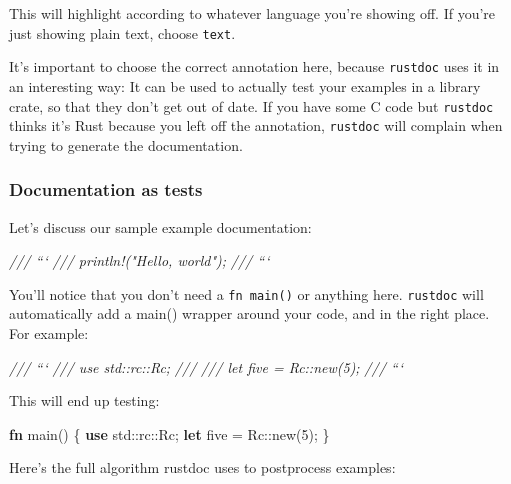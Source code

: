 \documentclass[a4paper,]{book}
\newenvironment{Shaded}{\begin{snugshade}}{\end{snugshade}}
\newcommand{\KeywordTok}[1]{\textcolor[rgb]{0.13,0.29,0.53}{\textbf{{#1}}}}
\newcommand{\DecValTok}[1]{\textcolor[rgb]{0.00,0.00,0.81}{{#1}}}
\newcommand{\CommentTok}[1]{\textcolor[rgb]{0.56,0.35,0.01}{\textit{{#1}}}}
\newcommand{\NormalTok}[1]{{#1}}
\begin{document}
This will highlight according to whatever language you're showing off.
If you're just showing plain text, choose \texttt{text}.

It's important to choose the correct annotation here, because
\texttt{rustdoc} uses it in an interesting way: It can be used to
actually test your examples in a library crate, so that they don't get
out of date. If you have some C code but \texttt{rustdoc} thinks it's
Rust because you left off the annotation, \texttt{rustdoc} will complain
when trying to generate the documentation.

\subsubsection{Documentation as tests}\label{documentation-as-tests}

Let's discuss our sample example documentation:

\begin{Shaded}
\begin{Highlighting}[]
\CommentTok{/// ```}
\CommentTok{/// println!("Hello, world");}
\CommentTok{/// ```}
\end{Highlighting}
\end{Shaded}

You'll notice that you don't need a \texttt{fn\ main()} or anything
here. \texttt{rustdoc} will automatically add a main() wrapper around
your code, and in the right place. For example:

\begin{Shaded}
\begin{Highlighting}[]
\CommentTok{/// ```}
\CommentTok{/// use std::rc::Rc;}
\CommentTok{///}
\CommentTok{/// let five = Rc::new(5);}
\CommentTok{/// ```}
\end{Highlighting}
\end{Shaded}

This will end up testing:

\begin{Shaded}
\begin{Highlighting}[]
\KeywordTok{fn} \NormalTok{main() \{}
    \KeywordTok{use} \NormalTok{std::rc::Rc;}
    \KeywordTok{let} \NormalTok{five = Rc::new(}\DecValTok{5}\NormalTok{);}
\NormalTok{\}}
\end{Highlighting}
\end{Shaded}

Here's the full algorithm rustdoc uses to postprocess examples:
\end{document}
